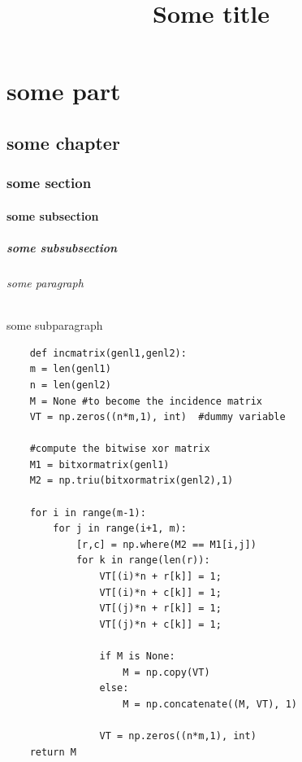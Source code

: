 \documentclass[11pt, parskip=half]{scrbook}
\begin{document}
\title{Some title}
\maketitle
\tableofcontents

\part{some part}
\chapter{some chapter}
\section{some section}
\subsection{some subsection}
\subsubsection{some subsubsection}
\paragraph{some paragraph}
\subparagraph{some subparagraph}


\begin{verbatim}
    def incmatrix(genl1,genl2):
    m = len(genl1)
    n = len(genl2)
    M = None #to become the incidence matrix
    VT = np.zeros((n*m,1), int)  #dummy variable
    
    #compute the bitwise xor matrix
    M1 = bitxormatrix(genl1)
    M2 = np.triu(bitxormatrix(genl2),1) 

    for i in range(m-1):
        for j in range(i+1, m):
            [r,c] = np.where(M2 == M1[i,j])
            for k in range(len(r)):
                VT[(i)*n + r[k]] = 1;
                VT[(i)*n + c[k]] = 1;
                VT[(j)*n + r[k]] = 1;
                VT[(j)*n + c[k]] = 1;
                
                if M is None:
                    M = np.copy(VT)
                else:
                    M = np.concatenate((M, VT), 1)
                
                VT = np.zeros((n*m,1), int)
    return M
\end{verbatim}
\end{document}
